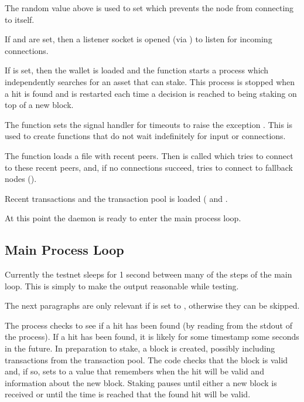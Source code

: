 The random value above is used to set {} which prevents the node
from connecting to itself.

If {} and {} are set, then a listener socket is opened (via {})
to listen for incoming connections.

If {} is set, then the wallet is loaded and the function {}
starts a {} process which independently searches for an asset that can stake.
This process is stopped when a hit is found and is restarted each time a decision is reached
to being staking on top of a new block.

The function {} sets the signal handler for timeouts to raise the exception {}.
This is used to create functions that do not wait indefinitely for input or connections.

The function {} loads a file with recent peers.
Then {} is called which tries to connect to these recent peers,
and, if no connections succeed, tries to connect to fallback nodes ({}).

Recent transactions and the transaction pool is loaded ({} and {}.

At this point the daemon is ready to enter the main process loop.

\subsection{Main Process Loop}

Currently the testnet sleeps for 1 second between many of the steps of the main loop.
This is simply to make the output reasonable while testing.

The next paragraphs are only relevant if {} is set to {},
otherwise they can be skipped.

The process checks to see if a hit has been found (by reading from the
stdout of the {} process). If a hit has been found, it is likely
for some timestamp some seconds in the future.
In preparation to stake, a block is created, possibly including transactions from the transaction pool.
The code checks that the block is valid and, if so, sets {}
to a value that remembers when the hit will be valid and information about the new block.
Staking pauses until either a new block is received or until the time is reached
that the found hit will be valid.

